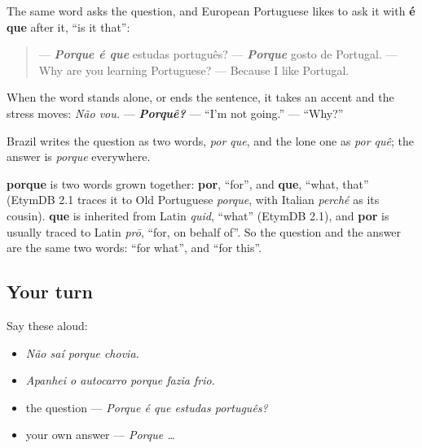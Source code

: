 \begin{grammarlens}[title={Grammar Lens: porque é que…?}]
The same word asks the question, and European Portuguese likes to ask it with \textbf{é que} after it, \textquotedblleft{}is it that\textquotedblright{}:

\begin{quote}
— \emph{\textbf{Porque é que}} estudas português? — \emph{\textbf{Porque}} gosto de Portugal. — Why are you learning Portuguese? — Because I like Portugal.
\end{quote}

When the word stands alone, or ends the sentence, it takes an accent and the stress moves: \emph{Não vou.} — \emph{\textbf{Porquê?}} — \textquotedblleft{}I'm not going.\textquotedblright{} — \textquotedblleft{}Why?\textquotedblright{}

Brazil writes the question as two words, \emph{por que}, and the lone one as \emph{por quê}; the answer is \emph{porque} everywhere.
\end{grammarlens}

\begin{cousinweb}
\textbf{porque} is two words grown together: \textbf{por}, \textquotedblleft{}for\textquotedblright{}, and \textbf{que}, \textquotedblleft{}what, that\textquotedblright{} (EtymDB 2.1 traces it to Old Portuguese \emph{porque}, with Italian \emph{perché} as its cousin). \textbf{que} is inherited from Latin \emph{quid}, \textquotedblleft{}what\textquotedblright{} (EtymDB 2.1), and \textbf{por} is usually traced to Latin \emph{prō}, \textquotedblleft{}for, on behalf of\textquotedblright{}. So the question and the answer are the same two words: \textquotedblleft{}for what\textquotedblright{}, and \textquotedblleft{}for this\textquotedblright{}.
\end{cousinweb}

\subsection*{Your turn}
Say these aloud:

\begin{itemize}
\raggedright
  \item \emph{Não saí porque chovia.}
  \item \emph{Apanhei o autocarro porque fazia frio.}
  \item the question — \emph{Porque é que estudas português?}
  \item your own answer — \emph{Porque …}
\end{itemize}

